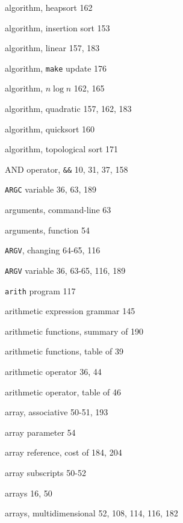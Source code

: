 \begin{multicols}{3}
\hangindent=4pc  algorithm, heapsort 162

\hangindent=4pc  algorithm, insertion sort 153

\hangindent=4pc  algorithm, linear 157, 183

\hangindent=4pc  algorithm, \verb'make' update 176

\hangindent=4pc  algorithm, $n\log n$ 162, 165

\hangindent=4pc  algorithm, quadratic 157, 162, 183

\hangindent=4pc  algorithm, quicksort 160

\hangindent=4pc  algorithm, topological sort 171

\hangindent=4pc  AND operator, \verb'&&' 10, 31, 37, 158

\hangindent=4pc  \verb'ARGC' variable 36, 63, 189

\hangindent=4pc  arguments, command-line 63

\hangindent=4pc  arguments, function 54

\hangindent=4pc  \verb'ARGV', changing 64-65, 116

\hangindent=4pc  \verb'ARGV' variable 36, 63-65, 116, 189

\hangindent=4pc  \verb'arith' program 117

\hangindent=4pc  arithmetic expression grammar 145

\hangindent=4pc  arithmetic functions, summary of 190

\hangindent=4pc  arithmetic functions, table of 39

\hangindent=4pc  arithmetic operator 36, 44

\hangindent=4pc  arithmetic operator, table of 46

\hangindent=4pc  array, associative 50-51, 193

\hangindent=4pc  array parameter 54

\hangindent=4pc  array reference, cost of 184, 204

\hangindent=4pc  array subscripts 50-52

\hangindent=4pc  arrays 16, 50

\hangindent=4pc  arrays, multidimensional 52, 108, 114, 116, 182


\end{multicols}
